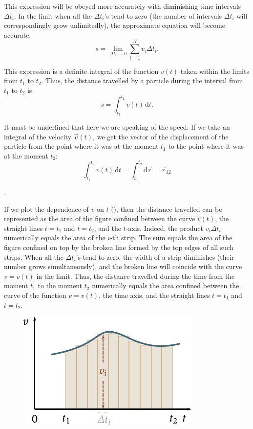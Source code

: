 \noindent
This expression will be obeyed more accurately with diminishing time intervals $\Delta t_i$. In the limit when all the $\Delta t_i$'s tend to zero (the number of intervals $\Delta t_i$ will correspondingly grow unlimitedly), the approximate equation will become accurate:
\begin{equation*}
s = \lim_{\Delta t_i\to 0} \sum_{i=1}^{N} v_i \Delta t_i.
\end{equation*}

This expression is a definite integral of the function $v(t)$ taken within the limits from $t_1$ to $t_2$. Thus, the distance travelled by a particle during the interval from $t_1$ to $t_2$ is
\begin{equation}\label{eq:1_74}
s = \int_{t_1}^{t_2} v(t)\,\mathrm{d}t.
\end{equation}

\noindent
It must be underlined that here we are speaking of the speed. If we take an integral of the velocity $\vec{v}(t)$, we get the vector of the displacement of the particle from the point where it was at the moment $t_1$ to the point where it was at the moment $t_2$:
\begin{equation}\label{eq:1_75}
\int_{t_1}^{t_2} v(t)\,\mathrm{d}t = \int_{t_1}^{t_2} \mathrm{d}\vec{r} = \vec{r}_{12}
\end{equation}

.

If we plot the dependence of $v$ on $t$ (), then the distance travelled can be represented as the area of the figure confined between the curve $v(t)$, the straight lines $t = t_1$ and $t = t_2$, and the $t$-axis. Indeed, the product $v_i\Delta t_i$ numerically equals the area of the $i$-th strip. The sum  equals the area of the figure confined on top by the broken line formed by the top edges of all such strips. When all the $\Delta t_i$'s tend to zero, the width of a strip diminishes (their number grows simultaneously), and the broken line will coincide with the curve $v = v(t)$ in the limit. Thus, the distance travelled during the time from the moment $t_1$ to the moment $t_2$ numerically equals the area confined between the curve of the function $v = v(t)$, the time axis, and the straight lines $t = t_1$ and $t = t_2$.

\begin{figure}[t]
	\begin{center}
		\includegraphics[scale=1]{figures/ch_01/fig_1_26.pdf}
		\caption[]{}
		\label{fig:1_26}
	\end{center}
	\vspace{-0.8cm}
\end{figure}

